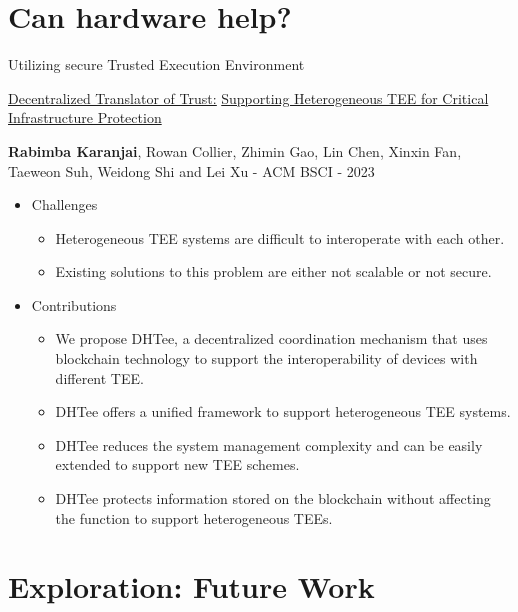 \documentclass[10pt,aspectratio=169]{beamer}
\begin{document}
\section{Can hardware help?}

\begin{frame}[fragile]{Utilizing secure Trusted Execution Environment}

\href{https://camps.aptaracorp.com/ACM_PMS/PMS/ACM/BSCI23/14/7b4e9185-e3b1-11ed-b37c-16bb50361d1f/OUT/bsci23-14.html}{\underline{Decentralized Translator of Trust:}} \underline{Supporting Heterogeneous TEE for Critical Infrastructure Protection}

{\textbf{Rabimba Karanjai}, Rowan Collier, Zhimin Gao, Lin Chen, Xinxin Fan, Taeweon Suh, Weidong Shi and Lei Xu} - {ACM BSCI} - {2023}

\begin{itemize}
\item Challenges
  \begin{itemize}
    \item Heterogeneous TEE systems are difficult to interoperate with each other.
    \item Existing solutions to this problem are either not scalable or not secure.
  \end{itemize}
\item Contributions
  \begin{itemize}
    \item We propose DHTee, a decentralized coordination mechanism that uses blockchain technology to support the interoperability of devices with different TEE.
    \item DHTee offers a unified framework to support heterogeneous TEE systems.
    \item DHTee reduces the system management complexity and can be easily extended to support new TEE schemes.
    \item DHTee protects information stored on the blockchain without affecting the function to support heterogeneous TEEs.
  \end{itemize}
\end{itemize}

\end{frame}

\section{Exploration: Future Work}
\end{document}
